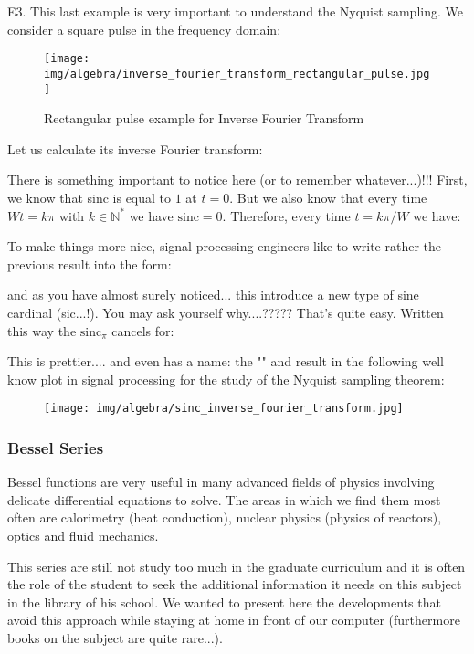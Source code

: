 	\pagebreak
	\begin{tcolorbox}[colframe=black,colback=white,sharp corners]
	E3.\label{inverse fourier transform square pulse} This last example is very important to understand the Nyquist sampling. We consider a square pulse in the frequency domain:
	\begin{figure}[H]
		\centering
		\texttt{[image: img/algebra/inverse\_fourier\_transform\_rectangular\_pulse.jpg]}
		\caption{Rectangular pulse example for Inverse Fourier Transform}
	\end{figure}
	Let us calculate its inverse Fourier transform:
	
	There is something important to notice here (or to remember whatever...)!!! First, we know that sinc is equal to $1$ at $t=0$. But we also know that every time $Wt=k\pi$ with $k\in\mathbb{N}^{*}$ we have $\mathrm{sinc}=0$. Therefore, every time $t=k\pi/W$ we have:
	
	To make things more nice, signal processing engineers like to write rather the previous result into the form:
	
	and as you have almost surely noticed... this introduce a new type of sine cardinal (sic...!).  You may ask yourself why....????? That's quite easy. Written this way the $\mathrm{sinc}_\pi$ cancels for:
	
	This is prettier.... and even has a name: the "" and result in the following well know plot in signal processing for the study of the Nyquist sampling theorem:
	\end{tcolorbox}
	\begin{tcolorbox}[colframe=black,colback=white,sharp corners]
	\begin{figure}[H]
		\centering
		\texttt{[image: img/algebra/sinc\_inverse\_fourier\_transform.jpg]}
	\end{figure}
	\end{tcolorbox}
	
	\pagebreak
	\subsubsection{Bessel Series}
	Bessel functions are very useful in many advanced fields of physics involving delicate differential equations to solve. The areas in which we find them most often are calorimetry (heat conduction), nuclear physics (physics of reactors), optics and fluid mechanics.
	
	This series are still not study too much in the graduate curriculum and it is often the role of the student to seek the additional information it needs on this subject in the library of his school. We wanted to present here the developments that avoid this approach while staying at home in front of our computer (furthermore books on the subject are quite rare...).
	

